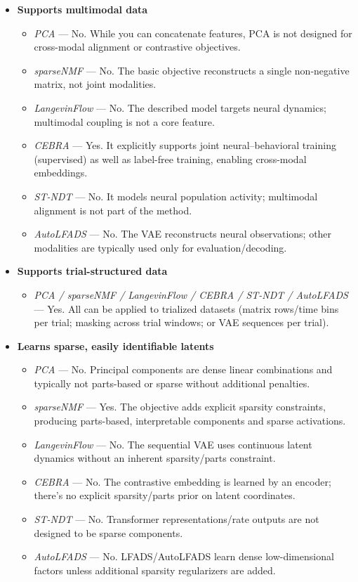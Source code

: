\begin{itemize}
\item \textbf{Supports multimodal data}
    \begin{itemize}
    \item \textit{PCA} — No. While you can concatenate features, PCA is not designed for cross-modal alignment or contrastive objectives.
    \item \textit{sparseNMF} — No. The basic objective reconstructs a single non-negative matrix, not joint modalities.
    \item \textit{LangevinFlow} — No. The described model targets neural dynamics; multimodal coupling is not a core feature.
    \item \textit{CEBRA} — Yes. It explicitly supports joint neural–behavioral training (supervised) as well as label-free training, enabling cross-modal embeddings.
    \item \textit{ST-NDT} — No. It models neural population activity; multimodal alignment is not part of the method.
    \item \textit{AutoLFADS} — No. The VAE reconstructs neural observations; other modalities are typically used only for evaluation/decoding.
    \end{itemize}

\item \textbf{Supports trial-structured data}
    \begin{itemize}
    \item \textit{PCA / sparseNMF / LangevinFlow / CEBRA / ST-NDT / AutoLFADS} — Yes. All can be applied to trialized datasets (matrix rows/time bins per trial; masking across trial windows; or VAE sequences per trial).
    \end{itemize}

\item \textbf{Learns sparse, easily identifiable latents}
    \begin{itemize}
    \item \textit{PCA} — No. Principal components are dense linear combinations and typically not parts-based or sparse without additional penalties.
    \item \textit{sparseNMF} — Yes. The objective adds explicit sparsity constraints, producing parts-based, interpretable components and sparse activations.
    \item \textit{LangevinFlow} — No. The sequential VAE uses continuous latent dynamics without an inherent sparsity/parts constraint.
    \item \textit{CEBRA} — No. The contrastive embedding is learned by an encoder; there's no explicit sparsity/parts prior on latent coordinates.
    \item \textit{ST-NDT} — No. Transformer representations/rate outputs are not designed to be sparse components.
    \item \textit{AutoLFADS} — No. LFADS/AutoLFADS learn dense low-dimensional factors unless additional sparsity regularizers are added.
    \end{itemize}


\end{itemize}
